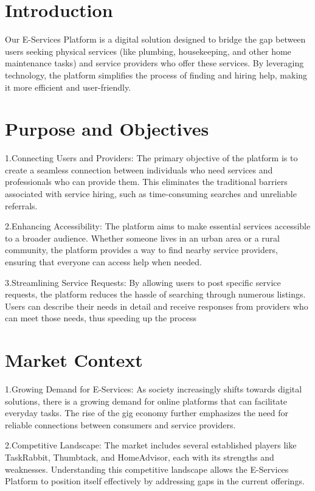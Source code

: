 \documentclass[12pt,a4paper]{report}
\begin{document}
\section{Introduction}
Our E-Services Platform is a digital solution designed to bridge the gap between users seeking physical services (like plumbing, housekeeping, and other home maintenance tasks) and service providers who offer these services. By leveraging technology, the platform simplifies the process of finding and hiring help, making it more efficient and user-friendly.
\section{Purpose and Objectives}
1.Connecting Users and Providers: The primary objective of the platform is to create a seamless connection between individuals who need services and professionals who can provide them. This eliminates the traditional barriers associated with service hiring, such as time-consuming searches and unreliable referrals.

2.Enhancing Accessibility: The platform aims to make essential services accessible to a broader audience. Whether someone lives in an urban area or a rural community, the platform provides a way to find nearby service providers, ensuring that everyone can access help when needed.

3.Streamlining Service Requests: By allowing users to post specific service requests, the platform reduces the hassle of searching through numerous listings. Users can describe their needs in detail and receive responses from providers who can meet those needs, thus speeding up the process
\section{Market Context}
1.Growing Demand for E-Services: As society increasingly shifts towards digital solutions, there is a growing demand for online platforms that can facilitate everyday tasks. The rise of the gig economy further emphasizes the need for reliable connections between consumers and service providers.

2.Competitive Landscape: The market includes several established players like TaskRabbit, Thumbtack, and HomeAdvisor, each with its strengths and weaknesses. Understanding this competitive landscape allows the E-Services Platform to position itself effectively by addressing gaps in the current offerings.
\textbf{                      }\\
\end{document}

